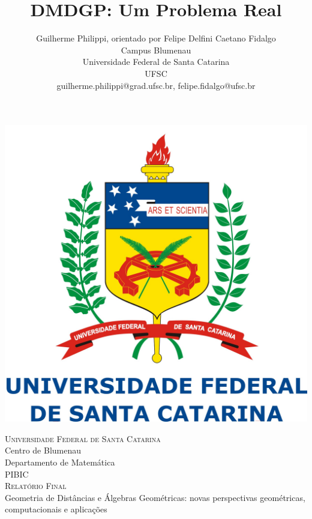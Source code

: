 \documentclass[a4paper,12pt]{article}
\title{DMDGP: Um Problema Real}
\author{Guilherme Philippi\Mark{*}, orientado por Felipe Delfini Caetano Fidalgo\Mark{\dagger}\\Campus Blumenau\\Universidade Federal de Santa Catarina\\UFSC
\\guilherme.philippi@grad.ufsc.br\Mark{*}, felipe.fidalgo@ufsc.br\Mark{\dagger}}
\begin{document}
	\begin{titlepage}
		\newcommand{\HRule}{\rule{\linewidth}{0.5mm}} %
		\center %
		\begin{center}
			\includegraphics[scale=0.22]{logoufsc.jpg}
		\end{center}
		\vspace{1cm}
		
		\textsc{\LARGE \hspace{-0.17cm}Universidade Federal de Santa Catarina}\\[0.5cm] %
		{\Large Centro de Blumenau \\ Departamento de Matemática}\\[1.5cm] %
		\textsc{\Large PIBIC \\ Relatório Final \vspace{1.5cm}  \\ }{\large Geometria de Distâncias e Álgebras Geométricas: novas perspectivas geométricas, computacionais e aplicações}\\[2.0cm] %
		

\end{titlepage}
\end{document}
